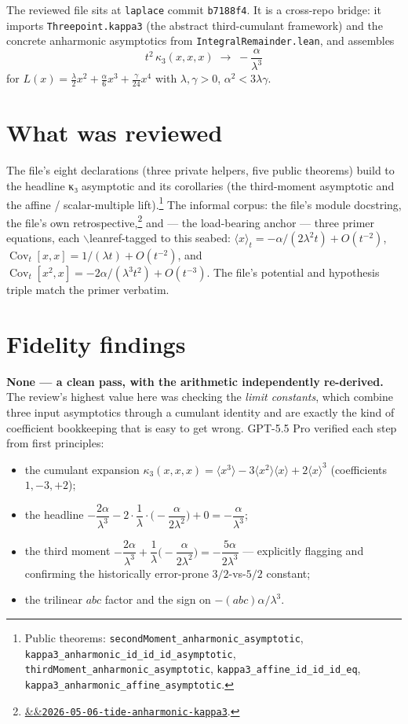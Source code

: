 \documentclass[11pt]{article}
\newcommand{\tideref}[2][]{\href{https://therisensea.org/tides/#2/}{\ifx&#1&\texttt{#2}\else#1\fi}}
\newcommand{\Cov}{\operatorname{Cov}}
\begin{document}
The reviewed file sits at \texttt{laplace} commit \texttt{b7188f4}. It is a
cross-repo bridge: it imports \texttt{Threepoint.kappa3} (the abstract third-cumulant
framework) and the concrete anharmonic asymptotics from
\texttt{IntegralRemainder.lean}, and assembles
\[
  t^2\,\kappa_3(x,x,x)\;\to\;-\frac{\alpha}{\lambda^3}
\]
for $L(x)=\tfrac\lambda2 x^2+\tfrac\alpha6 x^3+\tfrac\gamma{24}x^4$ with
$\lambda,\gamma>0$, $\alpha^2<3\lambda\gamma$.

\section{What was reviewed}

The file's eight declarations (three private helpers, five public theorems) build to
the headline κ₃ asymptotic and its corollaries (the third-moment asymptotic and the
affine / scalar-multiple lift).\footnote{Public theorems:
\texttt{secondMoment\_anharmonic\_asymptotic},
\texttt{kappa3\_anharmonic\_id\_id\_id\_asymptotic},
\texttt{thirdMoment\_anharmonic\_asymptotic}, \texttt{kappa3\_affine\_id\_id\_id\_eq},
\texttt{kappa3\_anharmonic\_affine\_asymptotic}.} The
informal corpus: the file's module docstring, the file's own
retrospective,\footnote{\tideref{2026-05-06-tide-anharmonic-kappa3}.} and --- the
load-bearing anchor --- three primer equations, each $\backslash$leanref-tagged to this seabed:
$\langle x\rangle_t=-\alpha/(2\lambda^2 t)+O(t^{-2})$,
$\Cov_t[x,x]=1/(\lambda t)+O(t^{-2})$, and
$\Cov_t[x^2,x]=-2\alpha/(\lambda^3 t^2)+O(t^{-3})$. The file's potential and
hypothesis triple match the primer verbatim.

\section{Fidelity findings}

\textbf{None --- a clean pass, with the arithmetic independently re-derived.} The
review's highest value here was checking the \emph{limit constants}, which combine
three input asymptotics through a cumulant identity and are exactly the kind of
coefficient bookkeeping that is easy to get wrong. GPT-5.5 Pro verified each step
from first principles:

\begin{itemize}[nosep]
\item the cumulant expansion $\kappa_3(x,x,x)=\langle x^3\rangle-3\langle x^2\rangle
  \langle x\rangle+2\langle x\rangle^3$ (coefficients $1,-3,+2$);
\item the headline $-\dfrac{2\alpha}{\lambda^3}-2\cdot\dfrac1\lambda\cdot
  \Big(-\dfrac{\alpha}{2\lambda^2}\Big)+0=-\dfrac{\alpha}{\lambda^3}$;
\item the third moment $-\dfrac{2\alpha}{\lambda^3}+\dfrac1\lambda\Big(-\dfrac{\alpha}
  {2\lambda^2}\Big)=-\dfrac{5\alpha}{2\lambda^3}$ --- explicitly flagging and
  confirming the historically error-prone $3/2$-vs-$5/2$ constant;
\item the trilinear $abc$ factor and the sign on $-(abc)\alpha/\lambda^3$.
\end{itemize}
\end{document}
